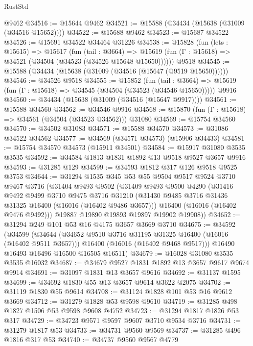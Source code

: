 \begin{lexlean}{RustStd}
\begin{coremodule}
    @9462
@34516 := @15644 @9462
@34521 := @15588 (@34434 (@15638 (@31009 (@34516 @15652))))
@34522 := @15688 @9462
@34523 := @15687 @34522
@34526 := @15691 @34522 @34464 @31226
@34538 := @15828
    (fun (lets : @15615) =>
    @15617
      (fun (tail : @3664) =>
      @15619 (fun (Γ : @15618) => @34521 (@34504 (@34523 (@34526 @15648 @15650))))))
    @9518
@34545 := @15588 (@34434 (@15638 (@31009 (@34516 (@15647 (@9519 @15650))))))
@34546 := @34526 @9518
@34555 := @15852
    (fun (tail : @3664) => @15619 (fun (Γ : @15618) => @34545 (@34504 (@34523 (@34546 @15650)))))
    @9916
@34560 := @34434 (@15638 (@31009 (@34516 (@15647 @9917))))
@34561 := @15588 @34560
@34562 := @34546 @9916
@34568 := @15870 (fun (Γ : @15618) => @34561 (@34504 (@34523 @34562))) @31080
@34569 := @15754 @34560
@34570 := @34502 @31083
@34571 := @15588 @34570
@34573 := @31086 @34522 @34562
@34577 := @34569 (@34571 @34573) (@15906 @34433)
@34581 := @15754 @34570 @34573 (@15911 @34501)
@34584 := @15917 @31080 @3535 @3535
@34592 := @34584 @1813 @1831 @1892 @13 @9518 @9527 @3657 @9916
@34593 := @31285 @129
@34599 := @34593 @1812 @317 @126 @9518 @9525 @3753
@34644 := @31294
    @1535
    @345
    @53
    @55
    @9504
    @9517
    @9524
    @3710
    @9467
    @3716
    (@31404
      @9493
      @9502
      (@31409
        @9493
        @9500
        @4290
        (@31416
          @9492
          @9499
          @3710
          @9475
          @3716
          @31210
          (@31430 @9485 @3716 @31436 @31325 @16400 (@16016 (@16402 @9486 @3657)))
          @16400
          (@16016 (@16402 @9476 @9492)))
        @19887
        @19890
        @19893
        @19897
        @19902
        @19908))
@34652 := @31294 @249 @101 @53 @16 @4175 @3657 @3669 @3710
@34675 := @34592
    (@34599
      (@34644
        (@34652 @9510 @3716 @31195 @31325 @16400 (@16016 (@16402 @9511 @3657)))
        @16400
        (@16016 (@16402 @9468 @9517)))
      @16490
      @16493
      @16496
      @16500
      @16505
      @16511)
@34679 := @16028 @31080 @3535 @3535 @16032
@34687 := @34679 @9527 @1831 @1892 @13 @3657 @9617 @9674 @9914
@34691 := @31097 @1831 @13 @3657 @9616
@34692 := @31137 @1595
@34699 := @34692 @1830 @55 @13 @3657 @9614 @3622 @2075
@34702 := @31119 @1830 @55 @9614
@34708 := @31124 @1828 @101 @53 @16 @9612 @3669
@34712 := @31279 @1828 @53 @9598 @9610
@34719 := @31285 @498 @1827 @1506 @53 @9598 @9608 @4752
@34723 := @31294 @1817 @1826 @53 @317
@34729 := @34723 @9571 @9597 @9607 @3710 @9534 @3716
@34731 := @31279 @1817 @53
@34733 := @34731 @9560 @9569
@34737 := @31285 @496 @1816 @317 @53
@34740 := @34737 @9560 @9567 @4779

\end{coremodule}
\end{lexlean}
